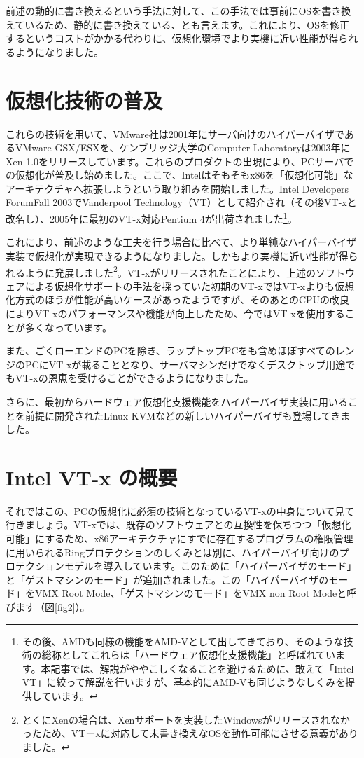 \documentclass[a4j,12pt]{jarticle}
\begin{document}
前述の動的に書き換えるという手法に対して、この手法では事前にOSを書き換えているため、静的に書き換えている、とも言えます。これにより、OSを修正するというコストがかかる代わりに、仮想化環境でより実機に近い性能が得られるようになりました。

\section{仮想化技術の普及}
これらの技術を用いて、VMware社は2001年にサーバ向けのハイパーバイザであるVMware GSX/ESXを、ケンブリッジ大学のComputer Laboratoryは2003年にXen 1.0をリリースしています。これらのプロダクトの出現により、PCサーバでの仮想化が普及し始めました。ここで、Intelはそもそもx86を「仮想化可能」なアーキテクチャへ拡張しようという取り組みを開始しました。Intel Developers ForumFall 2003でVanderpool Technology（VT）として紹介され（その後VT-xと改名し）、2005年に最初のVT-x対応Pentium 4が出荷されました\footnote{その後、AMDも同様の機能をAMD-Vとして出してきており、そのような技術の総称としてこれらは「ハードウェア仮想化支援機能」と呼ばれています。本記事では、解説がややこしくなることを避けるために、敢えて「Intel VT」に絞って解説を行いますが、基本的にAMD-Vも同じようなしくみを提供しています。}。

これにより、前述のような工夫を行う場合に比べて、より単純なハイパーバイザ実装で仮想化が実現できるようになりました。しかもより実機に近い性能が得られるように発展しました\footnote{とくにXenの場合は、Xenサポートを実装したWindowsがリリースされなかったため、VTーxに対応して未書き換えなOSを動作可能にさせる意義がありました。}。VT-xがリリースされたことにより、上述のソフトウェアによる仮想化サポートの手法を採っていた初期のVT-xではVT-xよりも仮想化方式のほうが性能が高いケースがあったようですが、そのあとのCPUの改良によりVT-xのパフォーマンスや機能が向上したため、今ではVT-xを使用することが多くなっています。

また、ごくローエンドのPCを除き、ラップトップPCをも含めほぼすべてのレンジのPCにVT-xが載ることとなり、サーバマシンだけでなくデスクトップ用途でもVT-xの恩恵を受けることができるようになりました。

さらに、最初からハードウェア仮想化支援機能をハイパーバイザ実装に用いることを前提に開発されたLinux KVMなどの新しいハイパーバイザも登場してきました。

\section{Intel VT-x の概要}
それではこの、PCの仮想化に必須の技術となっているVT-xの中身について見て行きましょう。VT-xでは、既存のソフトウェアとの互換性を保ちつつ「仮想化可能」にするため、x86アーキテクチャにすでに存在するプログラムの権限管理に用いられるRingプロテクションのしくみとは別に、ハイパーバイザ向けのプロテクションモデルを導入しています。このために「ハイパーバイザのモード」と「ゲストマシンのモード」が追加されました。この「ハイパーバイザのモード」をVMX Root Mode、「ゲストマシンのモード」をVMX non Root Modeと呼びます（図\ref{fig2}）。
\end{document}
